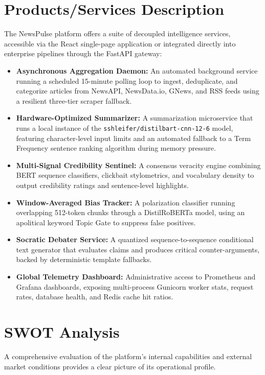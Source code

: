 \section{Products/Services Description}
The NewsPulse platform offers a suite of decoupled intelligence services, accessible via the React single-page application or integrated directly into enterprise pipelines through the FastAPI gateway:
\begin{itemize}
    \item \textbf{Asynchronous Aggregation Daemon:} An automated background service running a scheduled 15-minute polling loop to ingest, deduplicate, and categorize articles from NewsAPI, NewsData.io, GNews, and RSS feeds using a resilient three-tier scraper fallback.
    \item \textbf{Hardware-Optimized Summarizer:} A summarization microservice that runs a local instance of the \texttt{sshleifer/distilbart-cnn-12-6} model, featuring character-level input limits and an automated fallback to a Term Frequency sentence ranking algorithm during memory pressure.
    \item \textbf{Multi-Signal Credibility Sentinel:} A consensus veracity engine combining BERT sequence classifiers, clickbait stylometrics, and vocabulary density to output credibility ratings and sentence-level highlights.
    \item \textbf{Window-Averaged Bias Tracker:} A polarization classifier running overlapping 512-token chunks through a DistilRoBERTa model, using an apolitical keyword Topic Gate to suppress false positives.
    \item \textbf{Socratic Debater Service:} A quantized sequence-to-sequence conditional text generator that evaluates claims and produces critical counter-arguments, backed by deterministic template fallbacks.
    \item \textbf{Global Telemetry Dashboard:} Administrative access to Prometheus and Grafana dashboards, exposing multi-process Gunicorn worker stats, request rates, database health, and Redis cache hit ratios.
\end{itemize}

\section{SWOT Analysis}
A comprehensive evaluation of the platform's internal capabilities and external market conditions provides a clear picture of its operational profile.

